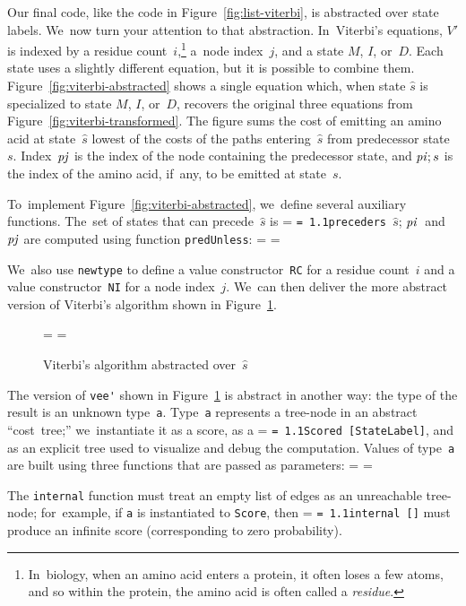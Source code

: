 \documentclass[]{jfp1}
\makeatletter
\newcommand\figref[1]{Figure~\ref{fig:#1}}
\newcommand\figlabel[1]{\label{fig:#1}}
\newif\ifverbatimsmall
\newcommand{\mono}[1]{%
  {\@tempdima = \fontdimen2\font
   \texttt{\spaceskip = 1.1\@tempdima #1}}}
\newcommand\smallverbatiminput[1]{%
  \verbatimsmalltrue
  \presvtopsep=\topsep
  \topsep=0.78\topsep
  \verbatimsmallfalse
  \topsep=\presvtopsep
}
\makeatother
\begin{document}
Our final code, like the code in \figref{list-viterbi}, is abstracted
over state labels.
We~now turn your attention to that abstraction.
In~Viterbi's equations,
$V'$ is indexed by a residue count~$i$,\footnote
{In~biology, when an amino acid enters a protein, it often loses a few
atoms, and so within the protein, the amino acid is often called
a \emph{residue}.}
a~node index~$j$,
and
a state $M$, $I$, or~$D$.
Each state uses a slightly different equation, but it is possible to
combine them.
\figref{viterbi-abstracted} shows a single equation which, when
state $\hat s$ is specialized to state $M$, $I$, or~$D$, recovers the
original three equations from \figref{viterbi-transformed}.
The figure sums the cost of emitting an amino acid at state~$\hat s$
lowest of the costs of the paths entering~$\hat s$ from predecessor
state~$s$.
Index~$\mathit{pj}$ is the index of the node containing the predecessor
state, and $\mathit{pi}; s$ is the index of the amino acid, if~any, to be
emitted at state~$s$.

To~implement \figref{viterbi-abstracted}, we~define several
auxiliary functions.
The~set of states that can precede~$\hat s$
is \mono{preceders~$\hat s$}; $\mathit{pi}$~and~$\mathit{pj}$ are computed using
function \texttt{predUnless}:
\smallverbatiminput{v4aux}
We~also use \texttt{newtype} to define 
a value constructor~\texttt{RC} for a residue count~$i$
and
a value constructor~\texttt{NI} for a node index~$j$.
We~can then deliver the more abstract version of Viterbi's algorithm
shown in \figref{viterbi-hov4}.


\begin{figure}
\noindent\hspace*{1.0cm}\begin{minipage}{11cm}
\smallverbatiminput{hov4}
\smallskip
\end{minipage}

\caption{Viterbi's algorithm abstracted over~$\hat s$}
\figlabel{viterbi-hov4}
\end{figure}


The version of \verb+vee'+ shown in  \figref{viterbi-hov4} is abstract
in another way: the type of the result is an unknown type~\texttt{a}.
Type~\texttt{a} represents a tree-node in an abstract ``cost~tree;''
we~instantiate it as a score, as a \mono{Scored~[StateLabel]},
and as an explicit tree used to visualize and debug the computation.
Values of type~\texttt{a} are built using three functions that are
passed as parameters:
\smallverbatiminput{hosigs}
The \texttt{internal} function must treat an empty list of edges as an
unreachable tree-node; for~example, if \texttt{a} is instantiated
to \texttt{Score}, then \mono{internal~[]} must produce an infinite
score (corresponding to zero probability).
\end{document}
